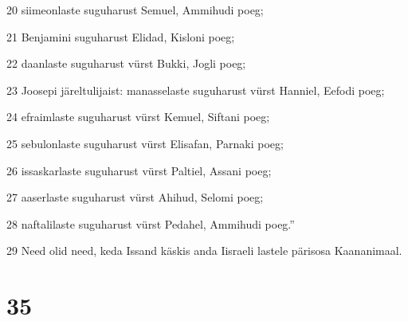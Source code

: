 \par 20 siimeonlaste suguharust Semuel, Ammihudi poeg;
\par 21 Benjamini suguharust Elidad, Kisloni poeg;
\par 22 daanlaste suguharust vürst Bukki, Jogli poeg;
\par 23 Joosepi järeltulijaist: manasselaste suguharust vürst Hanniel, Eefodi poeg;
\par 24 efraimlaste suguharust vürst Kemuel, Siftani poeg;
\par 25 sebulonlaste suguharust vürst Elisafan, Parnaki poeg;
\par 26 issaskarlaste suguharust vürst Paltiel, Assani poeg;
\par 27 aaserlaste suguharust vürst Ahihud, Selomi poeg;
\par 28 naftalilaste suguharust vürst Pedahel, Ammihudi poeg.”
\par 29 Need olid need, keda Issand käskis anda Iisraeli lastele pärisosa Kaananimaal.

\chapter{35}

